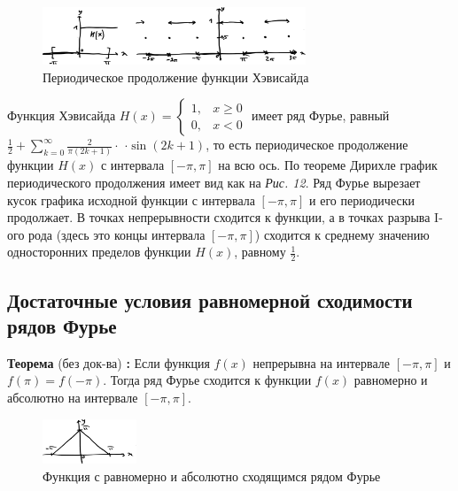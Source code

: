 \documentclass[12pt, a4paper]{article}
\begin{document}
\begin{figure}[h]
 \centering
 \includegraphics[width=0.7\textwidth]{12}
 \vspace{-4mm}
 \caption{Периодическое продолжение функции Хэвисайда}
\end{figure}

Функция Хэвисайда $H(x) = \begin{cases} 1, & x \geq 0 \\ 0, & x < 0 \end{cases}$ имеет ряд Фурье, равный $\tfrac{1}{2} + \sum_{k=0}^{\infty} \frac{2}{\pi (2k+1)} \cdot$ $\cdot \sin (2k+1)$, то есть периодическое продолжение функции $H(x)$ с интервала $[-\pi, \pi]$ на всю ось. По теореме Дирихле график периодического продолжения имеет вид как на \textit{Рис. 12}. Ряд Фурье вырезает кусок графика исходной функции с интервала $[-\pi, \pi]$ и его периодически продолжает. В точках непрерывности сходится к функции, а в точках разрыва I-ого рода (здесь это концы интервала $[-\pi, \pi]$) сходится к среднему значению односторонних пределов функции $H(x)$, равному $\tfrac{1}{2}$.

\subsection{Достаточные условия равномерной сходимости рядов Фурье}

\textbf{Теорема} (без док-ва) \textbf{:} Если функция $f(x)$ непрерывна на интервале $[-\pi, \pi]$ и $f(\pi) = f(-\pi)$. Тогда ряд Фурье сходится к функции $f(x)$ равномерно и абсолютно на интервале $[-\pi, \pi]$.

\begin{figure}
  \centering
  \vspace{-13mm}
  \includegraphics[width=0.25\textwidth]{13}
  \vspace{-6mm}
  \caption{Функция с равномерно и абсолютно сходящимся рядом Фурье}
\end{figure}
\end{document}
